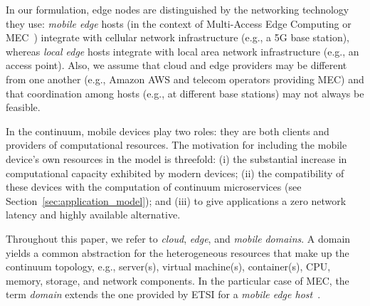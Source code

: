 %
%

In our formulation, edge nodes are distinguished by the networking technology they use: \textit{mobile edge} hosts (in the context of Multi-Access Edge Computing or MEC~\cite{etsimec16}) integrate with cellular network infrastructure (e.g., a 5G base station), whereas \textit{local edge} hosts integrate with local area network infrastructure (e.g., an access point). Also, we assume that cloud and edge providers may be different from one another (e.g., Amazon AWS and telecom operators providing MEC) and that coordination among hosts (e.g., at different base stations) may not always be feasible.




In the continuum, mobile devices play two roles: they are both clients and providers of computational resources. The motivation for including the mobile device's own resources in the model is threefold: (i) the substantial increase in computational capacity exhibited by modern devices; (ii) the compatibility of these devices with the computation of continuum microservices (see Section~\ref{sec:application_model}); and (iii) to give applications a zero network latency and highly available alternative.%


Throughout this paper, we refer to \textit{cloud}, \textit{edge}, and \textit{mobile} \textit{domains}. 
A domain yields a common  abstraction for the heterogeneous 
resources that make up the continuum topology, e.g., server(s), virtual machine(s), container(s), CPU, memory, storage, and network components. In the particular case of MEC, the term \textit{domain} extends the one provided by ETSI for a \textit{mobile edge host}~\cite{etsimec16,etsimec16:03}.



